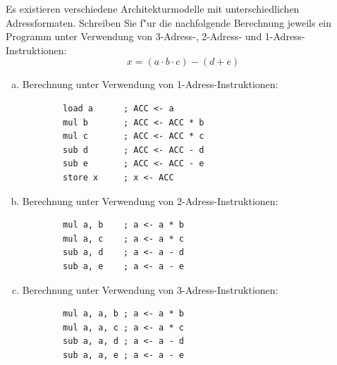 \documentclass[10pt, oneside]{article}
\begin{document}
Es existieren verschiedene Architekturmodelle mit unterschiedlichen
Adressformaten. Schreiben Sie f"ur die nachfolgende Berechnung jeweils ein
Programm unter Verwendung von 3-Adress-, 2-Adress- und 1-Adress-Instruktionen:
\begin{equation*}
    x = (a \cdot b \cdot c) - (d + e)
\end{equation*}

\begin{enumerate}[(a)]
    \itemsep0em
    \item Berechnung unter Verwendung von 1-Adress-Instruktionen:
        \begin{verbatim}
        load a      ; ACC <- a
        mul b       ; ACC <- ACC * b
        mul c       ; ACC <- ACC * c
        sub d       ; ACC <- ACC - d
        sub e       ; ACC <- ACC - e
        store x     ; x <- ACC
        \end{verbatim}

    \vspace{-0.3em}
    \item Berechnung unter Verwendung von 2-Adress-Instruktionen:
        \begin{verbatim}
        mul a, b    ; a <- a * b
        mul a, c    ; a <- a * c
        sub a, d    ; a <- a - d
        sub a, e    ; a <- a - e
        \end{verbatim}

    \vspace{-0.3em}
    \item Berechnung unter Verwendung von 3-Adress-Instruktionen:
        \begin{verbatim}
        mul a, a, b ; a <- a * b
        mul a, a, c ; a <- a * c
        sub a, a, d ; a <- a - d
        sub a, a, e ; a <- a - e
        \end{verbatim}
\end{enumerate}
\end{document}
